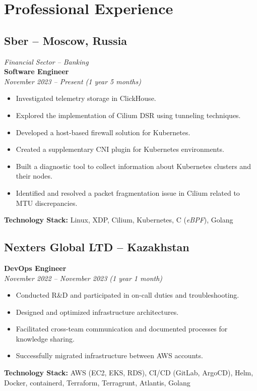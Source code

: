\documentclass[12pt,a4paper]{article}
\begin{document}
\section*{Professional Experience}

\subsection*{Sber – Moscow, Russia}
\textit{Financial Sector – Banking}\\
\textbf{Software Engineer}\\
\textit{November 2023 – Present (1 year 5 months)}
\begin{itemize}
    \item Investigated telemetry storage in ClickHouse.
    \item Explored the implementation of Cilium DSR using tunneling techniques.
    \item Developed a host-based firewall solution for Kubernetes.
    \item Created a supplementary CNI plugin for Kubernetes environments.
    \item Built a diagnostic tool to collect information about Kubernetes clusters and their nodes.
    \item Identified and resolved a packet fragmentation issue in Cilium related to MTU discrepancies.
\end{itemize}
\textbf{Technology Stack:} Linux, XDP, Cilium, Kubernetes, C (\textit{eBPF}), Golang

\subsection*{Nexters Global LTD – Kazakhstan}
\textbf{DevOps Engineer}\\
\textit{November 2022 – November 2023 (1 year 1 month)}
\begin{itemize}
    \item Conducted R\&D and participated in on-call duties and troubleshooting.
    \item Designed and optimized infrastructure architectures.
    \item Facilitated cross-team communication and documented processes for knowledge sharing.
    \item Successfully migrated infrastructure between AWS accounts.
\end{itemize}
\textbf{Technology Stack:} AWS (EC2, EKS, RDS), CI/CD (GitLab, ArgoCD), Helm, Docker, containerd, Terraform, Terragrunt, Atlantis, Golang
\end{document}
